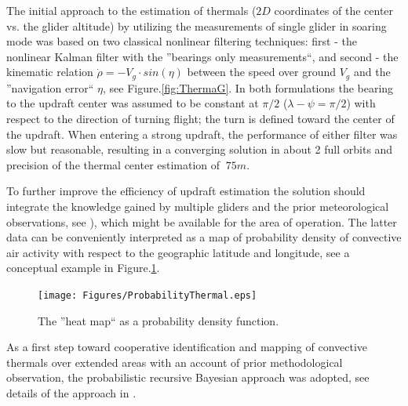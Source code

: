 \documentclass[letterpaper, 10 pt, conference]{ieeeconf}  %
\begin{document}
The initial approach to the estimation of thermals ($2D$ coordinates of the center vs. the glider altitude) by utilizing the measurements of single glider in soaring mode was based on two classical nonlinear filtering techniques: first - the nonlinear Kalman filter with the ''bearings only measurements``, and second - the kinematic relation $\dot{\rho}=-V_g\cdot sin(\eta)$ between the speed over ground $V_g$ and the ''navigation error`` $\eta$, see Figure.\ref{fig:ThermaG}. In both formulations the bearing to the updraft center was assumed to be constant at $\pi/2$ ($\lambda-\psi=\pi/2$) with respect to the direction of turning flight; the turn is defined toward the center of the updraft. When entering a strong updraft, the performance of either filter was slow but reasonable, resulting in a converging solution in about 2 full orbits and precision of the thermal center estimation of $~75m$.

To further improve the efficiency of updraft estimation the solution should integrate the knowledge gained by multiple gliders and the prior meteorological observations, see \cite{Pennycuick:1998,Hindman:2007}), which might be available for the area of operation. The latter data can be conveniently interpreted as a map of probability density of convective air activity with respect to the geographic latitude and longitude, see a conceptual example in Figure.\ref{fig:HeatMap}.
\begin{figure}[thpb]
  \centering
  \texttt{[image: Figures/ProbabilityThermal.eps]}
  \caption{The ''heat map`` as a probability density function.}
  \label{fig:HeatMap}
\end{figure}
As a first step toward cooperative identification and mapping of convective thermals over extended areas with an account of prior methodological observation, the probabilistic recursive Bayesian approach was adopted, see details of the approach in \cite{Bergman:1999}.
\end{document}

